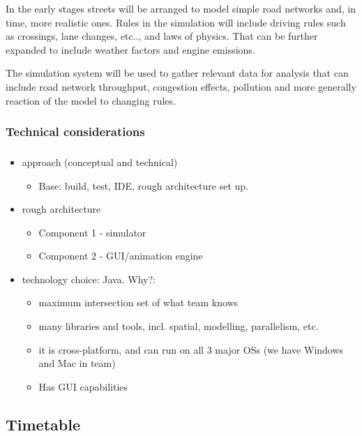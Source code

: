 In the early stages streets will be arranged to model simple road networks and, in time, more realistic ones.
Rules in the simulation will include driving rules such as crossings, lane changes, etc.., and laws of physics. That can be further expanded to include weather factors and engine emissions.

The simulation system will be used to gather relevant data for analysis that can include road network throughput, congestion effects, pollution and more generally reaction of the model to changing rules.

\subsubsection{Technical considerations} %


\subsubsection{}

	\begin{itemize}
		\item approach (conceptual and technical)
		\begin{itemize}
		    \item Base: build, test, IDE, rough architecture set up.


		\end{itemize}

		\item rough architecture
		\begin{itemize}
		    \item Component 1 - simulator
		    \item Component 2 - GUI/animation engine
		\end{itemize}

		\item technology choice: Java. Why?:
		\begin{itemize}
		    \item maximum intersection set of what team knows
		    \item many libraries and tools, incl. spatial, modelling, parallelism, etc.
		    \item it is cross-platform, and can run on all 3 major OSs (we have Windows and Mac in team)
		    \item Has GUI capabilities
		\end{itemize}

	\end{itemize}
\subsection{Timetable}


